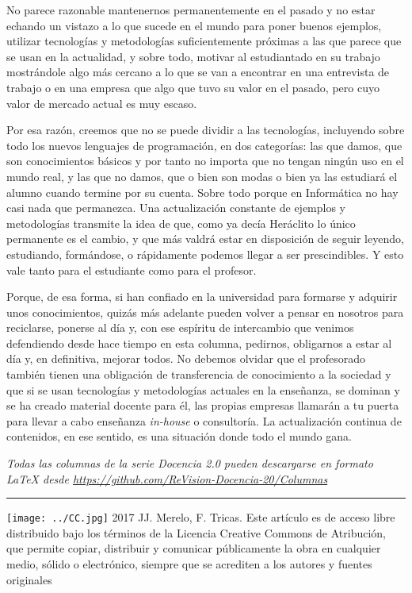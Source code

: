 \documentclass[twoside,10pt]{article}
\newcommand{\surl}[1]{{\small\url{#1}}}
\newcounter{vol}
\begin{document}
\begin{multicols}{2}
No parece razonable mantenernos permanentemente en el pasado y no estar
echando un vistazo a lo que sucede en el mundo para poner
buenos ejemplos, utilizar tecnologías y metodologías suficientemente próximas
a las que parece que se usan en la actualidad, y sobre todo,
motivar al estudiantado en su trabajo mostrándole algo más cercano a
lo que se van a encontrar en una entrevista de trabajo o en una
empresa que algo que tuvo su valor en el pasado, pero cuyo valor de
mercado actual es muy escaso. 

Por esa razón, creemos que no se puede dividir a
las tecnologías, incluyendo sobre todo los nuevos lenguajes de
programación, en dos categorías: las que damos, que son
conocimientos básicos y por tanto no importa que no tengan
ningún uso en el mundo real, y las que no damos, que o bien
son modas o bien ya las estudiará el alumno cuando termine por
su cuenta. Sobre todo porque en Informática no hay casi nada que permanezca. Una
actualización constante de ejemplos y metodologías transmite la idea
de que, como ya decía Heráclito lo único permanente es el cambio, y
que más valdrá estar en disposición de seguir leyendo, estudiando,
formándose, o rápidamente podemos llegar a ser prescindibles.  Y esto
vale tanto para el estudiante como para el profesor. 

Porque, de esa forma, si han confiado en la universidad para formarse
y adquirir unos conocimientos, quizás más adelante pueden volver a
pensar en nosotros para reciclarse, ponerse al día y, con ese espíritu
de intercambio que venimos defendiendo desde hace tiempo en esta
columna, pedirnos, obligarnos a estar al día y, en definitiva, mejorar
todos. No debemos olvidar que el profesorado también tienen una
obligación de transferencia de conocimiento a la sociedad y que si se
usan tecnologías y metodologías actuales en la enseñanza, se dominan y
se ha creado material docente para él, las propias empresas llamarán a
tu puerta para llevar a cabo enseñanza {\em in-house} o
consultoría. La actualización continua de contenidos, en ese sentido,
es una situación donde todo el mundo gana. 


\noindent\emph{Todas las columnas de la serie Docencia 2.0
pueden descargarse en formato LaTeX desde
\surl{https://github.com/ReVision-Docencia-20/Columnas}}

\noindent\rule{90mm}{1pt}

{\small \noindent\texttt{[image: ../CC.jpg]} 2017 JJ. Merelo, F. Tricas. Este artículo es de acceso libre distribuido bajo los términos
de la Licencia Creative Commons de Atribución, que permite copiar,
distribuir y comunicar públicamente la obra en cualquier medio, sólido
o electrónico, siempre que se acrediten a los autores y fuentes
originales}

\end{multicols}
\end{document}
